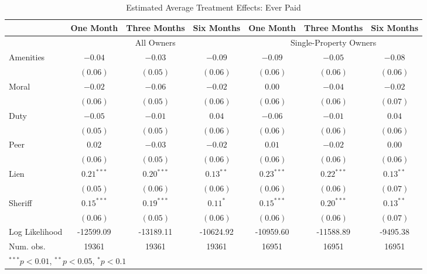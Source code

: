 \documentclass[12pt,titlepage]{article}
\begin{document}
\begin{sidewaystable}[htbp]
\caption{Estimated Average Treatment Effects: Ever Paid}
\begin{center}
\begin{tabular}{|l| c c c| c c c| }
\hline
               & One Month & Three Months & Six Months & One Month & Three Months & Six Months \\
\hline
 & \multicolumn{3}{c}{All Owners} & \multicolumn{3}{|c|}{Single-Property Owners} \\
Amenities      & $-0.04$      & $-0.03$      & $-0.09$     & $-0.09$      & $-0.05$      & $-0.08$     \\
               & $(0.06)$     & $(0.05)$     & $(0.06)$    & $(0.06)$     & $(0.06)$     & $(0.06)$    \\
Moral          & $-0.02$      & $-0.06$      & $-0.02$     & $0.00$       & $-0.04$      & $-0.02$     \\
               & $(0.06)$     & $(0.05)$     & $(0.06)$    & $(0.06)$     & $(0.06)$     & $(0.07)$    \\
Duty           & $-0.05$      & $-0.01$      & $0.04$      & $-0.06$      & $-0.01$      & $0.04$      \\
               & $(0.05)$     & $(0.05)$     & $(0.06)$    & $(0.06)$     & $(0.06)$     & $(0.06)$    \\
Peer           & $0.02$       & $-0.03$      & $-0.02$     & $0.01$       & $-0.02$      & $0.00$      \\
               & $(0.06)$     & $(0.05)$     & $(0.06)$    & $(0.06)$     & $(0.06)$     & $(0.06)$    \\
Lien           & $0.21^{***}$ & $0.20^{***}$ & $0.13^{**}$ & $0.23^{***}$ & $0.22^{***}$ & $0.13^{**}$ \\
               & $(0.05)$     & $(0.06)$     & $(0.06)$    & $(0.06)$     & $(0.06)$     & $(0.07)$    \\
Sheriff        & $0.15^{***}$ & $0.19^{***}$ & $0.11^{*}$  & $0.15^{***}$ & $0.20^{***}$ & $0.13^{**}$ \\
               & $(0.06)$     & $(0.05)$     & $(0.06)$    & $(0.06)$     & $(0.06)$     & $(0.07)$    \\
\hline
Log Likelihood & -12599.09    & -13189.11    & -10624.92   & -10959.60    & -11588.89    & -9495.38    \\
Num. obs.      & 19361        & 19361        & 19361       & 16951        & 16951        & 16951       \\
\hline
\multicolumn{7}{l}{\scriptsize{$^{***}p<0.01$, $^{**}p<0.05$, $^*p<0.1$}}
\end{tabular}
\label{tbl:reg7_ep}
\end{center}
\end{sidewaystable}
\end{document}
